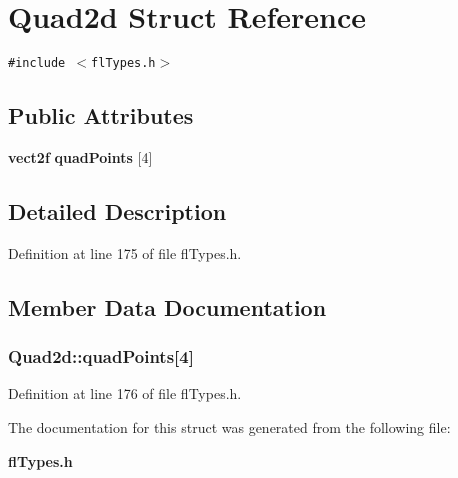 \section{Quad2d Struct Reference}
\label{structQuad2d}
{\tt \#include $<$fl\-Types.h$>$}

\subsection*{Public Attributes}
\begin{CompactItemize}
\item 
{\bf vect2f} {\bf quad\-Points} [4]
\end{CompactItemize}


\subsection{Detailed Description}




Definition at line 175 of file fl\-Types.h.

\subsection{Member Data Documentation}
\subsubsection{ {\bf Quad2d::quad\-Points}[4]}\label{structQuad2d_d86b05b5725304a24007d10d67e8a2ed}




Definition at line 176 of file fl\-Types.h.

The documentation for this struct was generated from the following file:\begin{CompactItemize}
\item 
{\bf fl\-Types.h}\end{CompactItemize}
